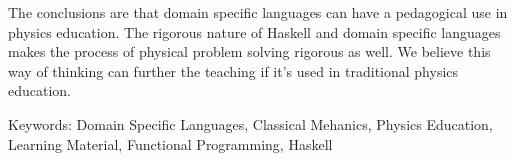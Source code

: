 The conclusions are that domain specific languages can have a pedagogical use in
physics education. The rigorous nature of Haskell and domain specific languages
makes the process of physical problem solving rigorous as well. We believe this
way of thinking can further the teaching if it's used in traditional physics
education.













\vfill
Keywords: Domain Specific Languages, Classical Mehanics, Physics Education, Learning Material, Functional Programming, Haskell


\newpage				%
\thispagestyle{empty}
\mbox{}

